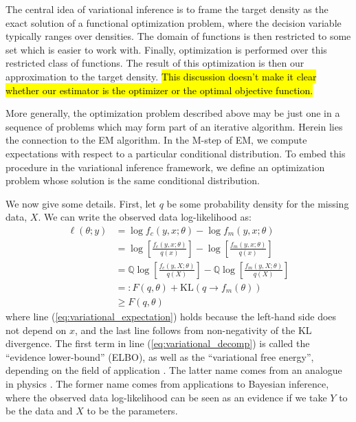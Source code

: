 \documentclass[11pt, oneside]{article}   	%
\newcommand{\bQ}{\mathbb{Q}}
\begin{document}
The central idea of variational inference is to frame the target density as the exact solution of a functional optimization problem, where the decision variable typically ranges over densities. The domain of functions is then restricted to some set which is easier to work with. Finally, optimization is performed over this restricted class of functions. The result of this optimization is then our approximation to the target density. \hl{This discussion doesn't make it clear whether our estimator is the optimizer or the optimal objective function.} 

More generally, the optimization problem described above may be just one in a sequence of problems which may form part of an iterative algorithm. Herein lies the connection to the EM algorithm. In the M-step of EM, we compute expectations with respect to a particular conditional distribution. To embed this procedure in the variational inference framework, we define an optimization problem whose solution is the same conditional distribution.

We now give some details. First, let $q$ be some probability density for the missing data, $X$. We can write the observed data log-likelihood as:
%
\begin{align}
    \ell(\theta; y) &= \log f_c(y, x; \theta) - \log f_m(y, x; \theta)\\
    &= \log \left[ \frac{f_c(y, x; \theta)}{q(x)} \right] - \log \left[ \frac{f_m(y, x; \theta)}{q(x)} \right]\\
    &= \bQ \log \left[ \frac{f_c(y, X; \theta)}{q(X)} \right] - \bQ \log \left[ \frac{f_m(y, X; \theta)}{q(X)} \right] \label{eq:variational_expectation}\\
    &=: F(q, \theta) + \mathrm{KL}(q \rightarrow f_m(\theta)) \label{eq:variational_decomp}\\
    & \geq F(q, \theta)
\end{align}
%
where line (\ref{eq:variational_expectation}) holds because the left-hand side does not depend on $x$, and the last line follows from non-negativity of the KL divergence. The first term in line (\ref{eq:variational_decomp}) is called the ``evidence lower-bound'' (ELBO), as well as the ``variational free energy'', depending on the field of application \citep{need}. The latter name comes from an analogue in physics \citep{need}. The former name comes from applications to Bayesian inference, where the observed data log-likelihood can be seen as an evidence if we take $Y$ to be the data and $X$ to be the parameters. 
\end{document}
